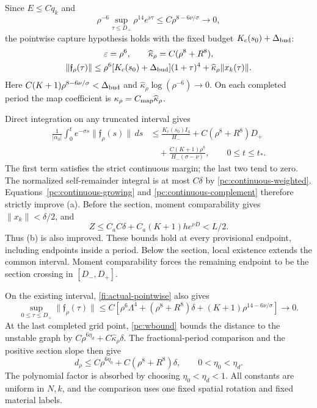 \documentclass[11pt]{amsart}
\theoremstyle{remark}
\numberwithin{equation}{section}
\begin{document}
Since $E\le Cq_k$ and
\[
 \rho^{-6}\sup_{\tau\le D_+}\rho^{14}e^{\nu\tau}
       \le C\rho^{8-6\nu/\sigma}\longrightarrow0,
\]
the pointwise capture hypothesis holds with the fixed budget
$K_c(s_0)+\Delta_{\rm bud}$:
\begin{equation}\label{fi:continuous-parameters}
 \begin{gathered}
 \varepsilon=\rho^6,\qquad
 \widehat\kappa_\rho=C(\rho^8+R^8),\\
 \|\mathfrak f_\rho(\tau)\|
 \le\rho^6[K_c(s_0)+\Delta_{\rm bud}](1+\tau)^4
       +\widehat\kappa_\rho\|x_k(\tau)\|.
 \end{gathered}
\end{equation}
Here $C(K+1)\rho^{8-6\nu/\sigma}<\Delta_{\rm bud}$ and
$\widehat\kappa_\rho\log(\rho^{-6})\to0$.
On each completed period the map coefficient is
$\kappa_\rho=C_{\rm map}\widehat\kappa_\rho$.

Direct integration on any truncated interval gives
\begin{equation}\label{fi:truncated-forcing-budget}
 \begin{split}
 \frac1{|\alpha_0|}\int_0^t e^{-\sigma s}
       \|\mathfrak f_\rho(s)\|\,ds
 &\le\frac{K_c(s_0)I_4}{H_-}
       +C(\rho^8+R^8)D_+\\
 &\quad+\frac{C(K+1)\rho^8}{H_-(\sigma-\nu)},
 \qquad0\le t\le t_*.
 \end{split}
\end{equation}
The first term satisfies the strict continuous margin; the last
two tend to zero. The normalized self-remainder integral is at
most $C\delta$ by \eqref{pc:continuous-weighted}.
Equations~\eqref{pc:continuous-growing} and
\eqref{pc:continuous-complement} therefore strictly improve (a).
Before the section, moment comparability gives $\|x_k\|<\delta/2$,
and
\[
 Z\le C_aC\delta+C_a(K+1)he^{\nu D}<L/2.
\]
Thus (b) is also improved. These bounds hold at every provisional
endpoint, including endpoints inside a period. Below the section,
local existence extends the common interval. Moment comparability
forces the remaining endpoint to be the section crossing in
$[D_-,D_+]$.

On the existing interval, \eqref{fi:actual-pointwise} also gives
\begin{equation}\label{fi:last-period-force}
 \sup_{0\le\tau\le D_+}\|\mathfrak f_\rho(\tau)\|
 \le C\left[\rho^6\Lambda^4+(\rho^8+R^8)\delta
       +(K+1)\rho^{14-6\nu/\sigma}\right]\longrightarrow0.
\end{equation}
At the last completed grid point, \eqref{pc:wbound} bounds the
distance to the unstable graph by
$C\rho^{6\eta_d}+C\widehat\kappa_\rho\delta$.
The fractional-period comparison and the positive section slope
then give
\begin{equation}\label{fi:reseterr}
 d_\rho\le C\rho^{6\eta_0}+C(\rho^8+R^8)\delta,
 \qquad0<\eta_0<\eta_d.
\end{equation}
The polynomial factor is absorbed by choosing $\eta_0<\eta_d<1$.
All constants are uniform in $N,k$, and the comparison uses one
fixed spatial rotation and fixed material labels.
\end{document}
